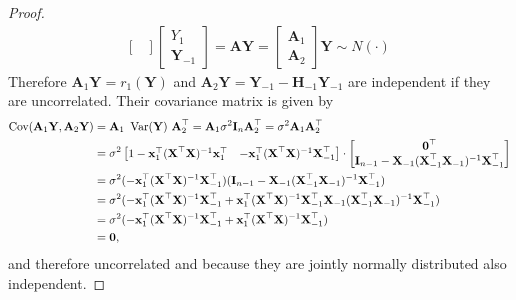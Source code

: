 \begin{proof}
\begin{align*}
\begin{bmatrix}
        \end{bmatrix}
        \begin{bmatrix}
            Y_1 \\
            \textbf{Y}_{-1}
        \end{bmatrix}
        =
        \textbf{AY} =
                \begin{bmatrix}
            \textbf{A}_1 \\
            \textbf{A}_2
        \end{bmatrix}
        \textbf{Y}
        \sim N(\cdot)
              \
    \end{align*}
    Therefore $\textbf{A}_1 \textbf{Y} = r_1(\textbf{Y})$ and $\textbf{A}_2 \textbf{Y} = \textbf{Y}_{-1} - \textbf{H}_{-1} \textbf{Y}_{-1}$ are independent if they are uncorrelated. Their covariance matrix is given by 
    \begin{align*}
        \operatorname{\text{Cov}}(\textbf{A}_1 \textbf{Y}, \mathbf{A}_2 \textbf{Y}) &= \textbf{A}_1\  \operatorname{\text{Var}}(\textbf{Y}) \ \textbf{A}_2^\top = \textbf{A}_1 \sigma^2 \textbf{I}_n \textbf{A}_2^\top = \sigma^2 \textbf{A}_1 \mathbf{A}_2^\top \\
        &= \sigma^2 
        \begin{bmatrix}
            1 - \textbf{x}_1^\top (\textbf{X}^\top \textbf{X})^{-1} \textbf{x}_1^\top & - \textbf{x}_1^\top (\textbf{X}^\top \textbf{X})^{-1} \textbf{X}_{-1}^\top
        \end{bmatrix}
        \cdot
        \begin{bmatrix}
            \textbf{0}^\top \\
            \textbf{I}_{n-1} - \textbf{X}_{-1} (\textbf{X}_{-1}^\top \textbf{X}_{-1})^{-1} \textbf{X}_{-1}^\top
        \end{bmatrix} \\
        &= \sigma^2 (- \textbf{x}_1^\top (\textbf{X}^\top \textbf{X})^{-1} \textbf{X}_{-1}^\top) (\textbf{I}_{n-1} - \textbf{X}_{-1} (\textbf{X}_{-1}^\top \textbf{X}_{-1})^{-1} \textbf{X}_{-1}^\top) \\
        &= \sigma^2 (- \textbf{x}_1^\top (\textbf{X}^\top \textbf{X})^{-1} \textbf{X}_{-1}^\top + \textbf{x}_1^\top (\textbf{X}^\top \textbf{X})^{-1} \textbf{X}_{-1}^\top \textbf{X}_{-1} (\textbf{X}_{-1}^\top \textbf{X}_{-1})^{-1} \textbf{X}_{-1}^\top) \\
        &= \sigma^2 (- \textbf{x}_1^\top (\textbf{X}^\top \textbf{X})^{-1} \textbf{X}_{-1}^\top + \textbf{x}_1^\top (\textbf{X}^\top \textbf{X})^{-1} \textbf{X}_{-1}^\top) \\
        &= \textbf{0},
    \end{align*}
    and therefore uncorrelated and because they are jointly normally distributed also independent.
\end{proof}

